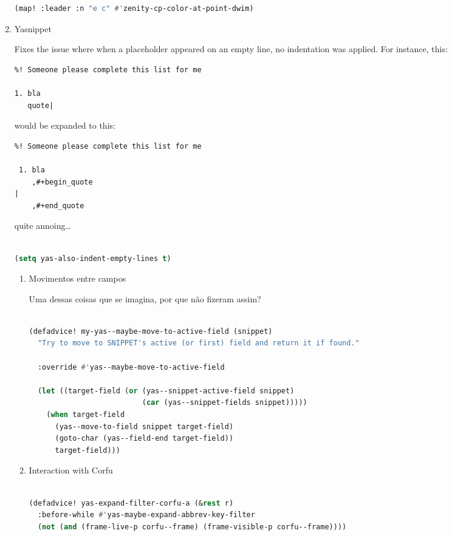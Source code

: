 \documentclass[11pt]{article}
\begin{document}
\begin{enumerate}
\begin{lstlisting}[language=Lisp]
(map! :leader :n "e c" #'zenity-cp-color-at-point-dwim)
\end{lstlisting}
  \item Yasnippet
  \label{sec:yasnippet}

  Fixes the issue where when a placeholder appeared on an empty line, no
indentation was applied. For instance, this:

\begin{lstlisting}%! Someone please complete this list for me

1. bla
   quote|
\end{lstlisting}

would be expanded to this:

\begin{lstlisting}%! Someone please complete this list for me

 1. bla
    ,#+begin_quote
|
    ,#+end_quote
\end{lstlisting}

quite annoing…

\begin{lstlisting}[language=Lisp]%! Someone please complete this list for me

(setq yas-also-indent-empty-lines t)
\end{lstlisting}
\begin{enumerate}
  \item Movimentos entre campos
  \label{sec:movimentos-entre-campos}

  Uma dessas coisas que se imagina, por que não fizeram assim?

\begin{lstlisting}[language=Lisp]%! Someone please complete this list for me

(defadvice! my-yas--maybe-move-to-active-field (snippet)
  "Try to move to SNIPPET's active (or first) field and return it if found."

  :override #'yas--maybe-move-to-active-field

  (let ((target-field (or (yas--snippet-active-field snippet)
                          (car (yas--snippet-fields snippet)))))
    (when target-field
      (yas--move-to-field snippet target-field)
      (goto-char (yas--field-end target-field))
      target-field)))
\end{lstlisting}
  \item Interaction with Corfu
  \label{sec:interaction-with-corfu}

  \begin{lstlisting}[language=Lisp]%! Someone please complete this list for me

(defadvice! yas-expand-filter-corfu-a (&rest r)
  :before-while #'yas-maybe-expand-abbrev-key-filter
  (not (and (frame-live-p corfu--frame) (frame-visible-p corfu--frame))))
\end{lstlisting}
\end{enumerate}

\end{enumerate}
\end{document}
